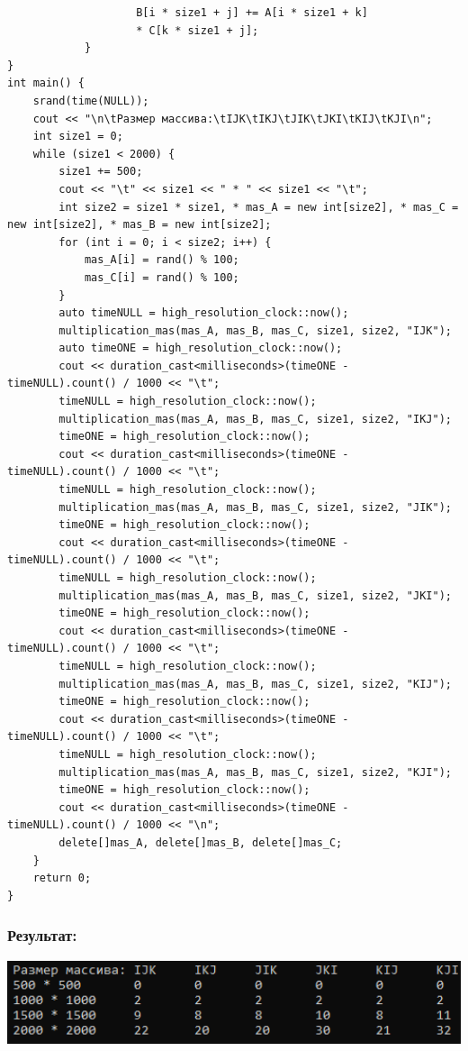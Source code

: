 \documentclass[a4paper]{article}
\begin{document}
\begin{verbatim}
                    B[i * size1 + j] += A[i * size1 + k]
                    * C[k * size1 + j];
            }
}
int main() {
    srand(time(NULL));
    cout << "\n\tРазмер массива:\tIJK\tIKJ\tJIK\tJKI\tKIJ\tKJI\n";
    int size1 = 0;
    while (size1 < 2000) {
        size1 += 500;
        cout << "\t" << size1 << " * " << size1 << "\t";
        int size2 = size1 * size1, * mas_A = new int[size2], * mas_C = new int[size2], * mas_B = new int[size2];
        for (int i = 0; i < size2; i++) {
            mas_A[i] = rand() % 100;
            mas_C[i] = rand() % 100;
        }
        auto timeNULL = high_resolution_clock::now();
        multiplication_mas(mas_A, mas_B, mas_C, size1, size2, "IJK");
        auto timeONE = high_resolution_clock::now();
        cout << duration_cast<milliseconds>(timeONE - timeNULL).count() / 1000 << "\t";
        timeNULL = high_resolution_clock::now();
        multiplication_mas(mas_A, mas_B, mas_C, size1, size2, "IKJ");
        timeONE = high_resolution_clock::now();
        cout << duration_cast<milliseconds>(timeONE - timeNULL).count() / 1000 << "\t";
        timeNULL = high_resolution_clock::now();
        multiplication_mas(mas_A, mas_B, mas_C, size1, size2, "JIK");
        timeONE = high_resolution_clock::now();
        cout << duration_cast<milliseconds>(timeONE - timeNULL).count() / 1000 << "\t";
        timeNULL = high_resolution_clock::now();
        multiplication_mas(mas_A, mas_B, mas_C, size1, size2, "JKI");
        timeONE = high_resolution_clock::now();
        cout << duration_cast<milliseconds>(timeONE - timeNULL).count() / 1000 << "\t";
        timeNULL = high_resolution_clock::now();
        multiplication_mas(mas_A, mas_B, mas_C, size1, size2, "KIJ");
        timeONE = high_resolution_clock::now();
        cout << duration_cast<milliseconds>(timeONE - timeNULL).count() / 1000 << "\t";
        timeNULL = high_resolution_clock::now();
        multiplication_mas(mas_A, mas_B, mas_C, size1, size2, "KJI");
        timeONE = high_resolution_clock::now();
        cout << duration_cast<milliseconds>(timeONE - timeNULL).count() / 1000 << "\n";
        delete[]mas_A, delete[]mas_B, delete[]mas_C;
    }
    return 0;
}
\end{verbatim}\normalsize
\subsubsection{Результат:}
\includegraphics[width=1\textwidth]{4_3.png}
\end{document}
